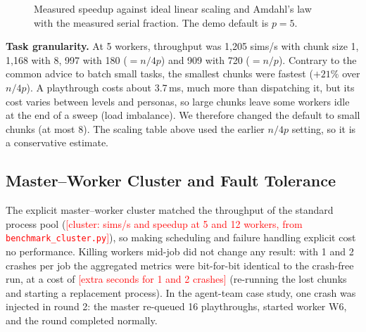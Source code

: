 \documentclass[conference]{IEEEtran}
\newcommand{\fillme}[1]{\textcolor{red}{[#1]}}
\begin{document}
\begin{figure}[t]
\centering
{}
\caption{Measured speedup against ideal linear scaling and Amdahl's law with the measured serial
fraction. The demo default is $p=5$.}
\label{fig:speedup}
\end{figure}

\textbf{Task granularity.} At 5 workers, throughput was 1,205 sims/s with chunk size 1, 1,168 with
8, 997 with 180 ($=n/4p$) and 909 with 720 ($=n/p$). Contrary to the common advice to batch small
tasks, the smallest chunks were fastest ($+21\%$ over $n/4p$). A playthrough costs about 3.7\,ms,
much more than dispatching it, but its cost varies between levels and personas, so large chunks
leave some workers idle at the end of a sweep (load imbalance). We therefore changed the default to
small chunks (at most 8). The scaling table above used the earlier $n/4p$ setting, so it is a
conservative estimate.

\subsection{Master--Worker Cluster and Fault Tolerance}
The explicit master--worker cluster matched the throughput of the standard process pool
(\fillme{cluster: sims/s and speedup at 5 and 12 workers, from \texttt{benchmark\_cluster.py}}),
so making scheduling and failure handling explicit cost no performance. Killing workers mid-job did not change any result:
with 1 and 2 crashes per job the aggregated metrics were bit-for-bit identical to the crash-free run,
at a cost of \fillme{extra seconds for 1 and 2 crashes} (re-running the lost chunks and starting a
replacement process). In the agent-team case study, one crash was injected in round 2: the master
re-queued 16 playthroughs, started worker W6, and the round completed normally.
\end{document}
